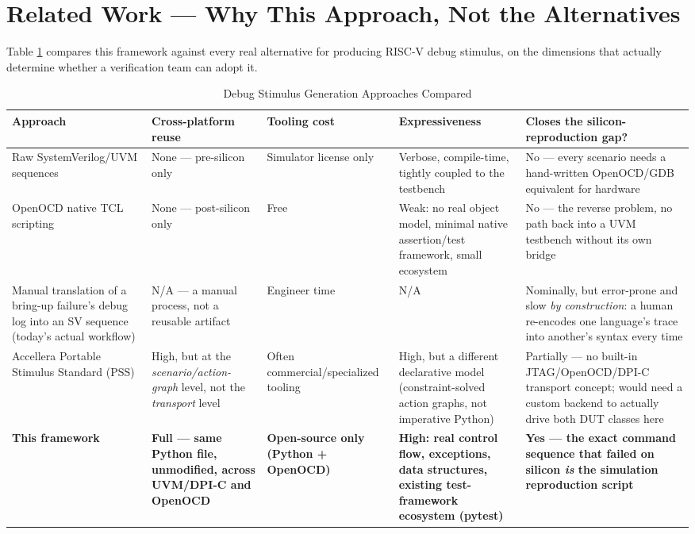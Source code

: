 \documentclass[conference]{IEEEtran}
\begin{document}
\section{Related Work --- Why This Approach, Not the Alternatives}

Table \ref{tab:approaches} compares this framework against every real alternative for producing RISC-V debug stimulus, on the dimensions that actually determine whether a verification team can adopt it.

\begin{table}[htbp]
\caption{Debug Stimulus Generation Approaches Compared}
\label{tab:approaches}
\centering
\begin{tabularx}{\textwidth}{@{}lXXXX@{}}
\toprule
\textbf{Approach} & \textbf{Cross-platform reuse} & \textbf{Tooling cost} & \textbf{Expressiveness} & \textbf{Closes the silicon-reproduction gap?} \\
\midrule
Raw SystemVerilog/UVM sequences & None --- pre-silicon only & Simulator license only & Verbose, compile-time, tightly coupled to the testbench & No --- every scenario needs a hand-written OpenOCD/GDB equivalent for hardware \\
\addlinespace
OpenOCD native TCL scripting & None --- post-silicon only & Free & Weak: no real object model, minimal native assertion/test framework, small ecosystem & No --- the reverse problem, no path back into a UVM testbench without its own bridge \\
\addlinespace
Manual translation of a bring-up failure's debug log into an SV sequence (today's actual workflow) & N/A --- a manual process, not a reusable artifact & Engineer time & N/A & Nominally, but error-prone and slow \textit{by construction}: a human re-encodes one language's trace into another's syntax every time \\
\addlinespace
Accellera Portable Stimulus Standard (PSS) & High, but at the \textit{scenario/action-graph} level, not the \textit{transport} level & Often commercial/specialized tooling & High, but a different declarative model (constraint-solved action graphs, not imperative Python) & Partially --- no built-in JTAG/OpenOCD/DPI-C transport concept; would need a custom backend to actually drive both DUT classes here \\
\addlinespace
\textbf{This framework} & \textbf{Full --- same Python file, unmodified, across UVM/DPI-C and OpenOCD} & \textbf{Open-source only (Python + OpenOCD)} & \textbf{High: real control flow, exceptions, data structures, existing test-framework ecosystem (pytest)} & \textbf{Yes --- the exact command sequence that failed on silicon \textit{is} the simulation reproduction script} \\
\bottomrule
\end{tabularx}
\end{table}
\end{document}
